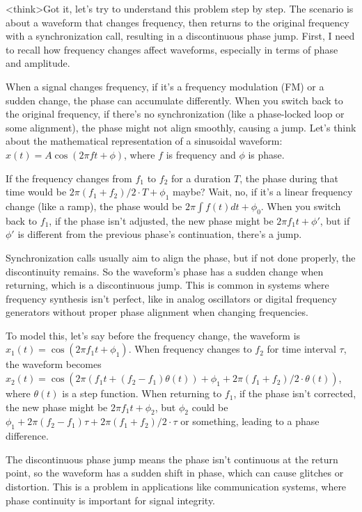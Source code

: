 <think>Got it, let's try to understand this problem step by step. The scenario is about a waveform that changes frequency, then returns to the original frequency with a synchronization call, resulting in a discontinuous phase jump. First, I need to recall how frequency changes affect waveforms, especially in terms of phase and amplitude.

When a signal changes frequency, if it's a frequency modulation (FM) or a sudden change, the phase can accumulate differently. When you switch back to the original frequency, if there's no synchronization (like a phase-locked loop or some alignment), the phase might not align smoothly, causing a jump. Let's think about the mathematical representation of a sinusoidal waveform: \( x(t) = A \cos(2\pi f t + \phi) \), where \( f \) is frequency and \( \phi \) is phase.

If the frequency changes from \( f_1 \) to \( f_2 \) for a duration \( T \), the phase during that time would be \( 2\pi (f_1 + f_2)/2 \cdot T + \phi_1 \) maybe? Wait, no, if it's a linear frequency change (like a ramp), the phase would be \( 2\pi \int f(t) dt + \phi_0 \). When you switch back to \( f_1 \), if the phase isn't adjusted, the new phase might be \( 2\pi f_1 t + \phi' \), but if \( \phi' \) is different from the previous phase's continuation, there's a jump.

Synchronization calls usually aim to align the phase, but if not done properly, the discontinuity remains. So the waveform's phase has a sudden change when returning, which is a discontinuous jump. This is common in systems where frequency synthesis isn't perfect, like in analog oscillators or digital frequency generators without proper phase alignment when changing frequencies.

To model this, let's say before the frequency change, the waveform is \( x_1(t) = \cos(2\pi f_1 t + \phi_1) \). When frequency changes to \( f_2 \) for time interval \( \tau \), the waveform becomes \( x_2(t) = \cos(2\pi (f_1 t + (f_2 - f_1) \theta(t)) + \phi_1 + 2\pi (f_1 + f_2)/2 \cdot \theta(t) ) \), where \( \theta(t) \) is a step function. When returning to \( f_1 \), if the phase isn't corrected, the new phase might be \( 2\pi f_1 t + \phi_2 \), but \( \phi_2 \) could be \( \phi_1 + 2\pi (f_2 - f_1) \tau + 2\pi (f_1 + f_2)/2 \cdot \tau \) or something, leading to a phase difference.

The discontinuous phase jump means the phase isn't continuous at the return point, so the waveform has a sudden shift in phase, which can cause glitches or distortion. This is a problem in applications like communication systems, where phase continuity is important for signal integrity.

